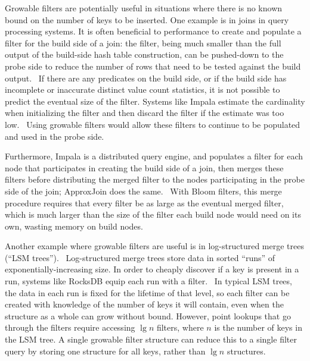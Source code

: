 \documentclass[letterpaper,twocolumn,10pt]{article}
\begin{document}
Growable filters are potentially useful in situations where there is no known bound on the number of keys to be inserted.
One example is in joins in query processing systems.
It is often beneficial to performance to create and populate a filter for the build side of a join:
the filter, being much smaller than the full output of the build-side hash table construction, can be pushed-down to the probe side to reduce the number of rows that need to be tested against the build output.~\cite{tpch-filter}
If there are any predicates on the build side, or if the build side has incomplete or inaccurate distinct value count statistics, it is not possible to predict the eventual size of the filter.
Systems like Impala estimate the cardinality when initializing the filter and then discard the filter if the estimate was too low.~\cite{impala}
Using growable filters would allow these filters to continue to be populated and used in the probe side.

Furthermore, Impala is a distributed query engine, and populates a filter for each node that participates in creating the build side of a join, then merges these filters before distributing the merged filter to the nodes participating in the probe side of the join; ApproxJoin does the same.~\cite{approxjoin, impala}
With Bloom filters, this merge procedure requires that every filter be as large as the eventual merged filter, which is much larger than the size of the filter each build node would need on its own, wasting memory on build nodes.

Another example where growable filters are useful is in log-structured merge trees (``LSM trees'').~\cite{lsm}
Log-structured merge trees store data in sorted ``runs'' of exponentially-increasing size.
In order to cheaply discover if a key is present in a run, systems like RocksDB equip each run with a filter.~\cite{lsm, ribbon}
In typical LSM trees, the data in each run is fixed for the lifetime of that level, so each filter can be created with knowledge of the number of keys it will contain, even when the structure as a whole can grow without bound.
However, point lookups that go through the filters require accessing $\lg n$ filters, where $n$ is the number of keys in the LSM tree.
A single growable filter structure can reduce this to a single filter query by storing one structure for all keys, rather than $\lg n$ structures.

\end{document}
